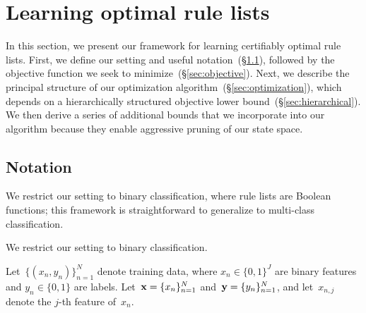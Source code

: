 \section{Learning optimal rule lists}
\label{sec:framework}

\begin{arxiv}
In this section, we present our framework for learning certifiably optimal rule lists.
%
First, we define our setting and useful notation~(\S\ref{sec:setup}),
followed by the objective function we seek to minimize~(\S\ref{sec:objective}).
%
Next, we describe the principal structure of our optimization algorithm~(\S\ref{sec:optimization}), which depends on a hierarchically
structured objective lower bound~(\S\ref{sec:hierarchical}).
%
We then derive a series of additional bounds that we incorporate into our
algorithm because they enable aggressive pruning of our state space.
\end{arxiv}

\subsection{Notation}
\label{sec:setup}

\begin{arxiv}
We restrict our setting to binary classification,
where rule lists are Boolean functions;
this framework is straightforward to generalize to multi-class classification.
\end{arxiv}
\begin{kdd}
We restrict our setting to binary classification.
\end{kdd}
%
Let~${\{(x_n, y_n)\}_{n=1}^N}$ denote training data,
where ${x_n \in \{0, 1\}^J}$ are binary features and ${y_n \in \{0, 1\}}$ are labels.
%
Let~${\mathbf{x} = \{x_n\}_{n=1}^N}$ and~${\mathbf{y} = \{y_n\}_{n=1}^N}$,
and let~${x_{n,j}}$ denote the $j$-th feature of~$x_n$.

